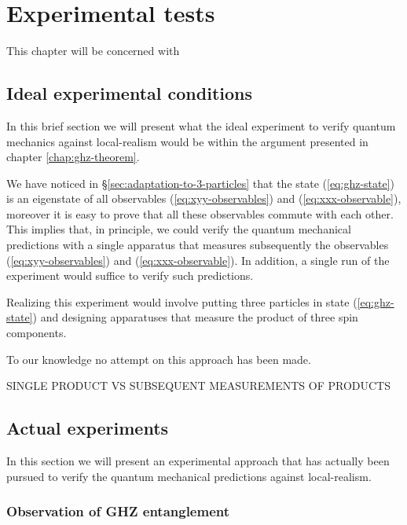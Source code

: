 \chapter{Experimental tests}
This chapter will be concerned with

\section{Ideal experimental conditions}
In this brief section we will present what the ideal experiment to verify quantum mechanics against local-realism would be within the argument presented in chapter \ref{chap:ghz-theorem}.%

We have noticed in \S \ref{sec:adaptation-to-3-particles} that the state (\ref{eq:ghz-state}) is an eigenstate of all observables (\ref{eq:xyy-observables}) and (\ref{eq:xxx-observable}), moreover it is easy to prove that all these observables commute with each other. This implies that, in principle, we could verify the quantum mechanical predictions with a single apparatus that measures subsequently the observables (\ref{eq:xyy-observables}) and (\ref{eq:xxx-observable}). In addition, a single run of the experiment would suffice to verify such predictions.

Realizing this experiment would involve putting three particles in state (\ref{eq:ghz-state}) and designing apparatuses that measure the product of three spin components.

To our knowledge no attempt on this approach has been made. 

\begin{observation}
SINGLE PRODUCT VS SUBSEQUENT MEASUREMENTS OF PRODUCTS
\end{observation}

\section{Actual experiments}
In this section we will present an experimental approach that has actually been pursued to verify the quantum mechanical predictions against local-realism.

\subsection{Observation of GHZ entanglement}

